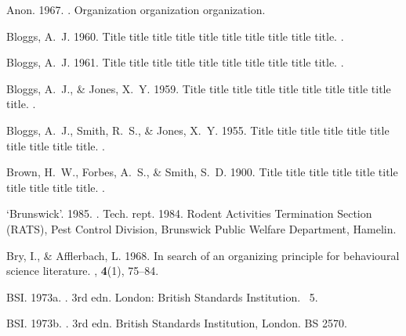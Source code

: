\begin{thebibliography}{}

Anon. 1967.
.
\newblock Organization organization organization.

Bloggs, A.~J. 1960.
\newblock Title title title title title title title title title title.
.

Bloggs, A.~J. 1961.
\newblock Title title title title title title title title title title.
.

Bloggs, A.~J., \& Jones, X.~Y. 1959.
\newblock Title title title title title title title title title title.
.

Bloggs, A.~J., Smith, R.~S., \& Jones, X.~Y. 1955.
\newblock Title title title title title title title title title title.
.

Brown, H.~W., Forbes, A.~S., \& Smith, S.~D. 1900.
\newblock Title title title title title title title title title title.
.

`Brunswick'. 1985.
.
\newblock Tech. rept. 1984. Rodent Activities Termination Section (RATS), Pest
  Control Division, Brunswick Public Welfare Department, Hamelin.

Bry, I., \& Afflerbach, L. 1968.
\newblock In search of an organizing principle for behavioural science
  literature.
, {\bf 4}(1), 75--84.

BSI. 1973a.
. 3rd edn.
\newblock London: British Standards Institution.
~5.

BSI. 1973b.
. 3rd edn.
\newblock British Standards Institution, London.
\newblock BS 2570.


\end{thebibliography}
